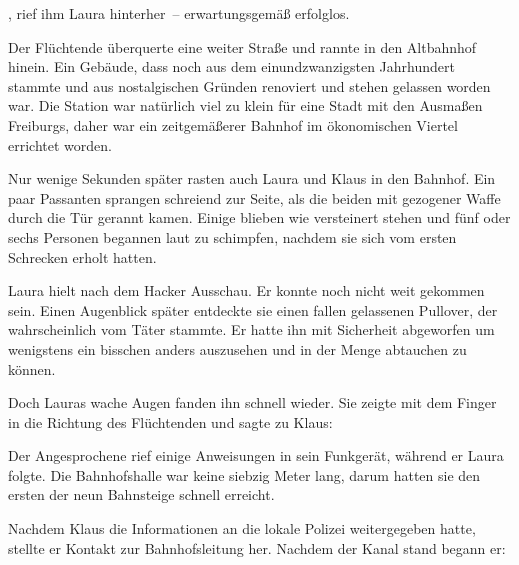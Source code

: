 \par

, rief ihm Laura hinterher~– erwartungsgemäß erfolglos.

\par

Der Flüchtende überquerte eine weiter Straße und rannte in den Altbahnhof hinein. Ein Gebäude, dass noch aus dem einundzwanzigsten Jahrhundert stammte und aus nostalgischen Gründen renoviert und stehen gelassen worden war. Die Station war natürlich viel zu klein für eine Stadt mit den Ausmaßen Freiburgs, daher war ein zeitgemäßerer Bahnhof im ökonomischen Viertel errichtet worden.

\par

Nur wenige Sekunden später rasten auch Laura und Klaus in den Bahnhof. Ein paar Passanten sprangen schreiend zur Seite, als die beiden mit gezogener Waffe durch die Tür gerannt kamen. Einige blieben wie versteinert stehen und fünf oder sechs Personen begannen laut zu schimpfen, nachdem sie sich vom ersten Schrecken erholt hatten.

\par

Laura hielt nach dem Hacker Ausschau. Er konnte noch nicht weit gekommen sein. Einen Augenblick später entdeckte sie einen fallen gelassenen Pullover, der wahrscheinlich vom Täter stammte. Er hatte ihn mit Sicherheit abgeworfen um wenigstens ein bisschen anders auszusehen und in der Menge abtauchen zu können.

\par

Doch Lauras wache Augen fanden ihn schnell wieder. Sie zeigte mit dem Finger in die Richtung des Flüchtenden und sagte zu Klaus: 

\par

Der Angesprochene rief einige Anweisungen in sein Funkgerät, während er Laura folgte. Die Bahnhofshalle war keine siebzig Meter lang, darum hatten sie den ersten der neun Bahnsteige schnell erreicht.

\par

Nachdem Klaus die Informationen an die lokale Polizei weitergegeben hatte, stellte er Kontakt zur Bahnhofsleitung her. Nachdem der Kanal stand begann er: 

